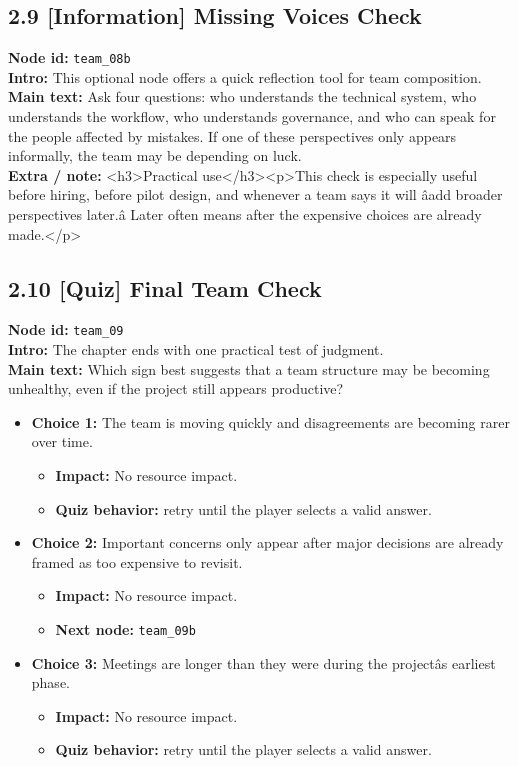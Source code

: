 \documentclass[11pt]{article}
\begin{document}
\subsection*{2.9 [Information] Missing Voices Check}
\textbf{Node id:} \texttt{team\_08b}\\
\textbf{Intro:} This optional node offers a quick reflection tool for team composition.\\
\textbf{Main text:} Ask four questions: who understands the technical system, who understands the workflow, who understands governance, and who can speak for the people affected by mistakes. If one of these perspectives only appears informally, the team may be depending on luck.\\
\textbf{Extra / note:} <h3>Practical use</h3><p>This check is especially useful before hiring, before pilot design, and whenever a team says it will âadd broader perspectives later.â Later often means after the expensive choices are already made.</p>\\
\subsection*{2.10 [Quiz] Final Team Check}
\textbf{Node id:} \texttt{team\_09}\\
\textbf{Intro:} The chapter ends with one practical test of judgment.\\
\textbf{Main text:} Which sign best suggests that a team structure may be becoming unhealthy, even if the project still appears productive?\\
\begin{itemize}
\item \textbf{Choice 1:} The team is moving quickly and disagreements are becoming rarer over time.
\begin{itemize}
\item \textbf{Impact:} No resource impact.
\item \textbf{Quiz behavior:} retry until the player selects a valid answer.
\end{itemize}
\item \textbf{Choice 2:} Important concerns only appear after major decisions are already framed as too expensive to revisit.
\begin{itemize}
\item \textbf{Impact:} No resource impact.
\item \textbf{Next node:} \texttt{team\_09b}
\end{itemize}
\item \textbf{Choice 3:} Meetings are longer than they were during the projectâs earliest phase.
\begin{itemize}
\item \textbf{Impact:} No resource impact.
\item \textbf{Quiz behavior:} retry until the player selects a valid answer.
\end{itemize}
\end{itemize}
\end{document}
